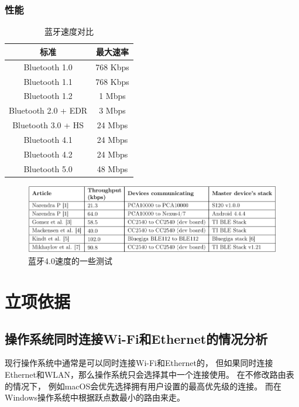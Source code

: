 \documentclass[11pt]{article}
\begin{document}
\subsubsection{性能}
\begin{table}[H]
\begin{center}
\begin{tabular}{cc}
    \toprule
    标准 & 最大速率\\
    \midrule
    Bluetooth 1.0 & 768 Kbps  \\
    Bluetooth 1.1 & 768 Kbps  \\
    Bluetooth 1.2 & 1 Mbps  \\
    Bluetooth 2.0 + EDR & 3 Mbps \\
    Bluetooth 3.0 + HS & 24 Mbps \\
    Bluetooth 4.1 & 24 Mbps \\
    Bluetooth 4.2 & 24 Mbps \\
    Bluetooth 5.0 & 48 Mbps \\
    \bottomrule
\end{tabular}
\caption{蓝牙速度对比}
\end{center}
\end{table}
\begin{figure}[H]
    \begin{center}
    \includegraphics[width=\textwidth]{figures//bluetooth4_speed.png}
    \caption{蓝牙4.0速度的一些测试}
    \end{center}
\end{figure}
\section{立项依据}
\subsection{操作系统同时连接Wi-Fi和Ethernet的情况分析}
现行操作系统中通常是可以同时连接Wi-Fi和Ethernet的，
但如果同时连接Ethernet和WLAN，那么操作系统只会选择其中一个连接使用。
在不修改路由表的情况下，
例如macOS会优先选择拥有用户设置的最高优先级的连接。
而在Windows操作系统中根据跃点数最小的路由来走。
\end{document}
